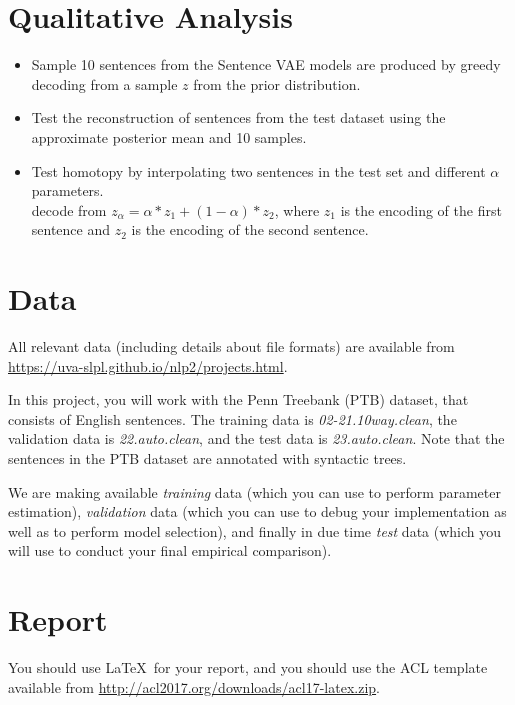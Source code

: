 \section{Qualitative Analysis}

\begin{itemize}
\item Sample 10 sentences from the Sentence VAE models are produced by greedy decoding from a sample $z$ from the prior distribution. 
\item Test the reconstruction of sentences from the test dataset using the approximate posterior mean and 10 samples.
\item Test homotopy by interpolating two sentences in the test set and different $\alpha$ parameters.\\
decode from $z_{\alpha}=\alpha * z_{1}+(1-\alpha) * z_{2}$, where $z_1$ is the encoding of the first sentence and $z_2$ is the encoding of the second sentence.
\end{itemize}


\section{Data}

All relevant data (including details about file formats) are available from \url{https://uva-slpl.github.io/nlp2/projects.html}.

In this project, you will work with the Penn Treebank (PTB) dataset, that consists of English sentences. The training data is \textit{02-21.10way.clean}, the validation data is \textit{22.auto.clean}, and the test data is \textit{23.auto.clean}. 
Note that the sentences in the PTB dataset are annotated with syntactic trees. 

We are making available \emph{training} data (which you can use to perform parameter estimation), \emph{validation} data (which you can use to debug your implementation as well as to perform model selection), and finally in due time \emph{test} data (which you will use to conduct your final empirical comparison).



\section{Report}

You should use \LaTeX~for your report, and you should use the ACL template available from \url{http://acl2017.org/downloads/acl17-latex.zip}. 

